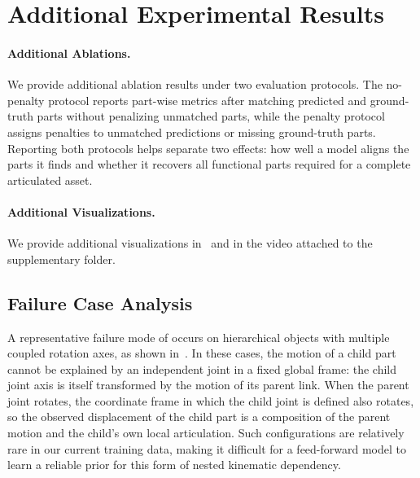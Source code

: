 \section{Additional Experimental Results}
\label{sec:supp_additional_experiments}

\paragraph{Additional Ablations.}
We provide additional ablation results under two evaluation protocols.
The no-penalty protocol reports part-wise metrics after matching predicted and ground-truth parts without penalizing unmatched parts, while the penalty protocol assigns penalties to unmatched predictions or missing ground-truth parts.
Reporting both protocols helps separate two effects: how well a model aligns the parts it finds and whether it recovers all functional parts required for a complete articulated asset.



\paragraph{Additional Visualizations.}

We provide additional visualizations in~ and in the video attached to the supplementary folder.

\subsection{Failure Case Analysis}
\label{sec:supp_failure_case}




A representative failure mode of \method occurs on hierarchical objects with multiple coupled rotation axes, as shown in~.
In these cases, the motion of a child part cannot be explained by an independent joint in a fixed global frame: the child joint axis is itself transformed by the motion of its parent link.
When the parent joint rotates, the coordinate frame in which the child joint is defined also rotates, so the observed displacement of the child part is a composition of the parent motion and the child's own local articulation.
Such configurations are relatively rare in our current training data, making it difficult for a feed-forward model to learn a reliable prior for this form of nested kinematic dependency.

